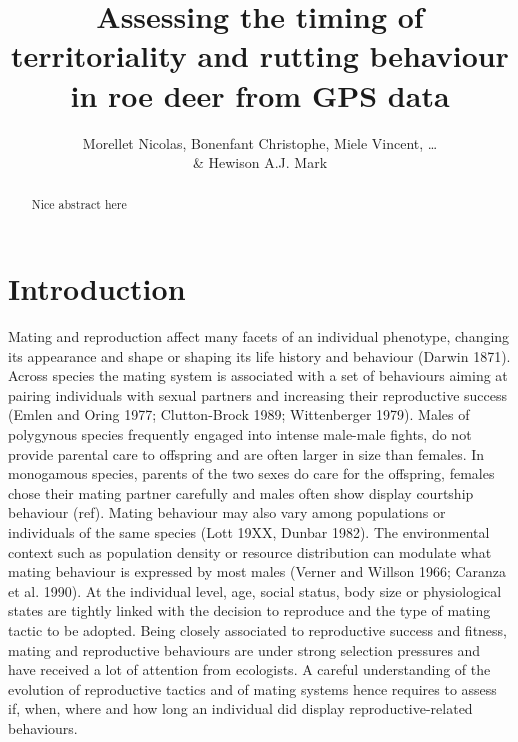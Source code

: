 \documentclass[a4paper,11pt]{article}
\title{Assessing the timing of territoriality and rutting behaviour in
  roe deer from GPS data}
\author{Morellet Nicolas, Bonenfant Christophe, Miele Vincent,
  \ldots\\ \& Hewison A.J. Mark}
\begin{document}
\maketitle

\newpage
\begin{abstract}
Nice abstract here
\end{abstract}

\newpage
\section{Introduction}

Mating and reproduction affect many facets of an individual phenotype,
changing its appearance and shape or shaping its life history and
behaviour (Darwin 1871).  Across species
the mating system is associated with a set of behaviours aiming at
pairing individuals with sexual partners and increasing their
reproductive success (Emlen and Oring 1977; Clutton-Brock 1989;
Wittenberger 1979). Males of polygynous species frequently engaged
into intense male-male fights, do not provide parental care to
offspring and are often larger in size than females. In monogamous
species, parents of the two sexes do care for the offspring, females
chose their mating partner carefully and males often show display
courtship behaviour (ref). Mating behaviour may also vary among
populations or individuals of the same species (Lott 19XX, Dunbar
1982). The environmental context such as population density or
resource distribution can modulate what mating behaviour is expressed
by most males (Verner and Willson 1966; Caranza et al. 1990). At the
individual level, age, social status, body size or physiological
states are tightly linked with the decision to reproduce and the type
of mating tactic to be adopted. Being closely associated to
reproductive success and fitness, mating and reproductive behaviours
are under strong selection pressures and have received a lot of
attention from ecologists. A careful understanding of the evolution of
reproductive tactics and of mating systems hence requires to assess
if, when, where and how long an individual did display
reproductive-related behaviours.
\end{document}
